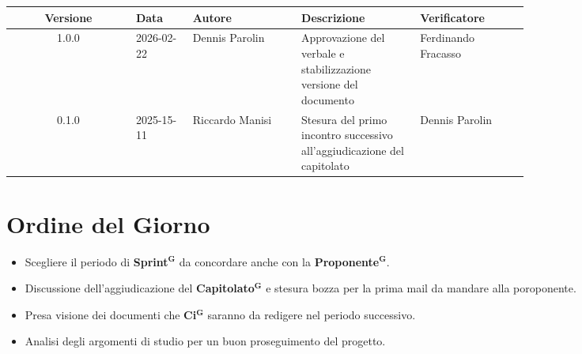 \documentclass[a4paper,12pt]{article}
\newcommand{\term}[1]{\textbf{#1}$^\mathbf{G}$}
\begin{document}
\begin{center}
\small
\renewcommand{\arraystretch}{1.2} 
\begin{tabular}{|c|p{0.11\linewidth}|p{0.21\linewidth}|p{0.23\linewidth}|p{0.21\linewidth}|}
\hline
\rowcolor{gray!60} 
\textbf{Versione} & \textbf{Data} & \textbf{Autore} & \textbf{Descrizione} & \textbf{Verificatore} \\
\hline

\rowcolor{white}
1.0.0 & 2026-02-22 & Dennis Parolin & Approvazione del verbale e stabilizzazione versione del documento & Ferdinando Fracasso \\
\hline
\rowcolor{gray!20}
0.1.0 & 2025-15-11 & Riccardo Manisi & Stesura del primo incontro successivo all'aggiudicazione del capitolato & Dennis Parolin \\
\hline
\end{tabular}
\end{center}

\clearpage
\tableofcontents
\thispagestyle{empty} %
\clearpage

\section{Ordine del Giorno}
\begin{itemize}
    \item Scegliere il periodo di \term{Sprint} da concordare anche con la \term{Proponente}.
    \item Discussione dell'aggiudicazione del \term{Capitolato} e stesura bozza per la prima mail da mandare alla poroponente.
    \item Presa visione dei documenti che \term{Ci} saranno da redigere nel periodo successivo.
    \item Analisi degli argomenti di studio per un buon proseguimento del progetto.
\end{itemize}

\end{document}
